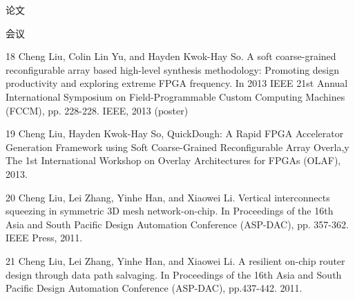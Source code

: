\documentclass{resume} %
\begin{document}
\begin{rSection}{论文}
\begin{rSubsection} {会议}{}{}{}
    \item 18 Cheng Liu, Colin Lin Yu, and Hayden Kwok-Hay So. A soft coarse-grained reconfigurable array based high-level synthesis methodology: Promoting design productivity and exploring extreme FPGA frequency. In 2013 IEEE 21st Annual International Symposium on Field-Programmable Custom Computing Machines (FCCM), pp. 228-228. IEEE, 2013 (poster)

    \item 19 Cheng Liu, Hayden Kwok-Hay So, QuickDough: A Rapid FPGA Accelerator Generation Framework using Soft Coarse-Grained Reconfigurable Array Overla,y The 1st International Workshop on Overlay Architectures for FPGAs (OLAF), 2013.

    \item 20 Cheng Liu, Lei Zhang, Yinhe Han, and Xiaowei Li. Vertical interconnects squeezing in symmetric 3D mesh network-on-chip. In Proceedings of the 16th Asia and South Pacific Design Automation Conference (ASP-DAC), pp. 357-362. IEEE Press, 2011.

    \item 21 Cheng Liu, Lei Zhang, Yinhe Han, and Xiaowei Li. A resilient on-chip router design through data path salvaging. In Proceedings of the 16th Asia and South Pacific Design Automation Conference (ASP-DAC), pp.437-442. 2011.
    \end{rSubsection}

\end{rSection}
\end{document}
